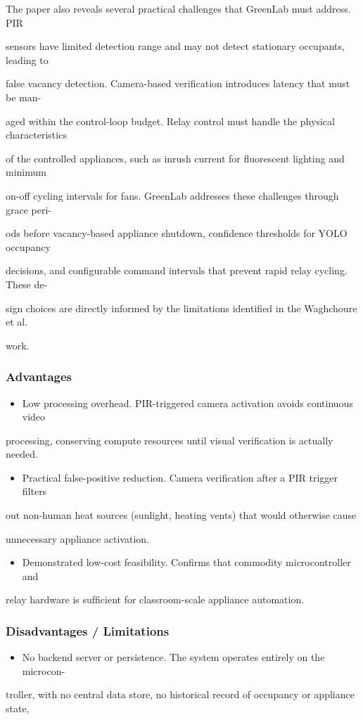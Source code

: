 The paper also reveals several practical challenges that GreenLab must address. PIR

sensors have limited detection range and may not detect stationary occupants, leading to

false vacancy detection. Camera-based veriﬁcation introduces latency that must be man-

aged within the control-loop budget. Relay control must handle the physical characteristics

of the controlled appliances, such as inrush current for ﬂuorescent lighting and minimum

on-off cycling intervals for fans. GreenLab addresses these challenges through grace peri-

ods before vacancy-based appliance shutdown, conﬁdence thresholds for YOLO occupancy

decisions, and conﬁgurable command intervals that prevent rapid relay cycling. These de-

sign choices are directly informed by the limitations identiﬁed in the Waghchoure et al.

work.


\subsubsection*{Advantages}
\begin{itemize}
	\item Low processing overhead. PIR-triggered camera activation avoids continuous video
\end{itemize}
processing, conserving compute resources until visual veriﬁcation is actually needed.

\begin{itemize}
	\item Practical false-positive reduction. Camera veriﬁcation after a PIR trigger ﬁlters
\end{itemize}
out non-human heat sources (sunlight, heating vents) that would otherwise cause

unnecessary appliance activation.

\begin{itemize}
	\item Demonstrated low-cost feasibility. Conﬁrms that commodity microcontroller and
\end{itemize}
relay hardware is sufﬁcient for classroom-scale appliance automation.


\subsubsection*{Disadvantages / Limitations}
\begin{itemize}
	\item No backend server or persistence. The system operates entirely on the microcon-
\end{itemize}
troller, with no central data store, no historical record of occupancy or appliance state,

